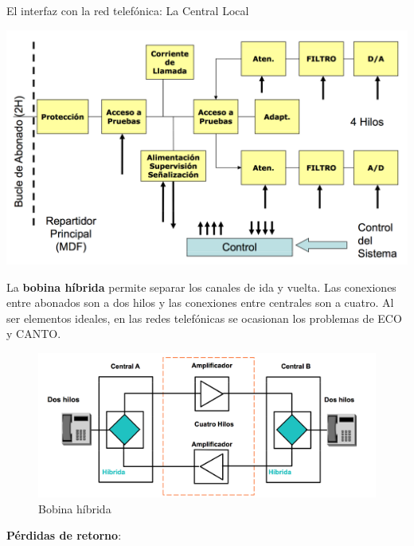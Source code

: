 \documentclass[10pt,portrait, twocolumn]{article}
\makeatletter
\renewcommand{\subsubsection}{\@startsection{subsubsection}{3}{0mm}%
                                {-1ex plus -.5ex minus -.2ex}%
                                {1ex plus .2ex}%
                                {\normalfont\small\bfseries}}
\makeatother
\begin{document}
El interfaz con la red telefónica: La Central Local

	\begin{center}
		\includegraphics[scale=0.2]{images/InterfazRed}
	\end{center}


La \textbf{bobina híbrida} permite separar los canales de ida y vuelta. Las conexiones entre abonados son a dos hilos y las conexiones entre centrales son a cuatro. Al ser elementos ideales, en las redes telefónicas se ocasionan los problemas de ECO y CANTO.
%
	
	\begin{figure}[!ht]
 		\centering
  		 \includegraphics[scale = 0.25]{images/BobinaHibrida}
		\caption{Bobina híbrida}
	\end{figure}
	
\textbf{Pérdidas de retorno}:
\end{document}
